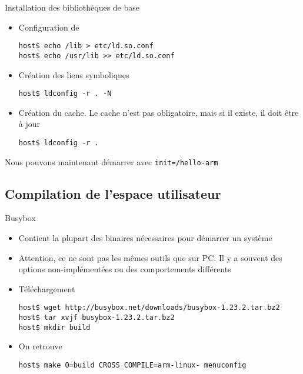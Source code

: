 \begin{frame}[fragile=singleslide]{Installation des bibliothèques de base}
  \begin{itemize}
  \item Configuration de 
    \begin{lstlisting}
host$ echo /lib > etc/ld.so.conf
host$ echo /usr/lib >> etc/ld.so.conf
    \end{lstlisting}
  \item Création des liens symboliques
    \begin{lstlisting}
host$ ldconfig -r . -N
    \end{lstlisting}
  \item Création du cache. Le  cache n'est pas obligatoire, mais si il
    existe, il doit être à jour
    \begin{lstlisting}
host$ ldconfig -r .
    \end{lstlisting}
  \end{itemize}
  Nous pouvons maintenant démarrer avec \verb+init=/hello-arm+
\end{frame}

\subsection{Compilation de l'espace utilisateur}

\begin{frame}[fragile=singleslide]{Busybox}
  \begin{itemize}
  \item  Contient la plupart  des binaires  nécessaires pour  démarrer un
    système
  \item Attention, ce ne  sont pas les mêmes outils que sur  PC. Il y a
    souvent des options non-implémentées ou des comportements différents
  \item Téléchargement
    \begin{lstlisting}
host$ wget http://busybox.net/downloads/busybox-1.23.2.tar.bz2
host$ tar xvjf busybox-1.23.2.tar.bz2
host$ mkdir build
    \end{lstlisting}
  \item On retrouve 
    \begin{lstlisting}
host$ make O=build CROSS_COMPILE=arm-linux- menuconfig
    \end{lstlisting}
  \end{itemize}
\end{frame}

